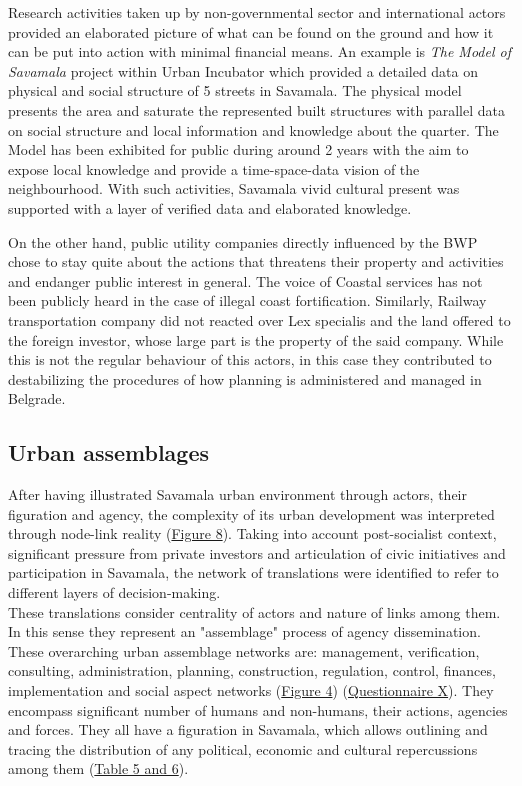 \documentclass[11pt]{report}
\begin{document}
Research activities taken up by non-governmental sector and international actors provided an elaborated picture of what can be found on the ground and how it can be put into action with minimal financial means.
An example is \textit{The Model of Savamala} project within Urban Incubator which provided a detailed data on physical and social structure of 5 streets in Savamala.
The physical model presents the area and saturate the represented built structures with parallel data on social structure and local information and knowledge about the quarter. The Model has been exhibited for public during around 2 years with the aim to expose local knowledge and provide a time-space-data vision of the neighbourhood. 
With such activities, Savamala vivid cultural present was supported with a layer of verified data and elaborated knowledge.

On the other hand, public utility companies directly influenced by the BWP chose to stay quite about the actions that threatens their property and activities and endanger public interest in general. The voice of Coastal services has not been publicly heard in the case of illegal coast fortification. Similarly, Railway transportation company did not reacted over Lex specialis and the land offered to the foreign investor, whose large part is the property of the said company.  While this is not the regular behaviour of this actors, in this case they contributed to destabilizing the procedures of how planning is administered and managed in Belgrade.

\subsection{Urban assemblages}

After having illustrated Savamala urban environment through actors, their figuration and agency, the complexity of its urban development was interpreted through node-link reality (\href{ref}{Figure 8}).
Taking into account post-socialist context, significant pressure from private investors and articulation of civic initiatives and participation in Savamala, the network of translations were identified to refer to different layers of decision-making.
\\

These translations consider centrality of actors and nature of links among them. In this sense they represent an "assemblage" process of agency dissemination.
These overarching urban assemblage networks are: management, verification, consulting, administration, planning, construction, regulation, control, finances, implementation and social aspect networks (\href{ref}{Figure 4}) (\href{Questionnaire Experts Post-socialist}{Questionnaire X}).
They encompass significant number of humans and non-humans, their actions, agencies and forces. 
They all have a figuration in Savamala, which allows outlining and tracing the distribution of any political, economic and cultural repercussions among them (\href{ref}{Table 5 and 6}).
\\ 
\end{document}
